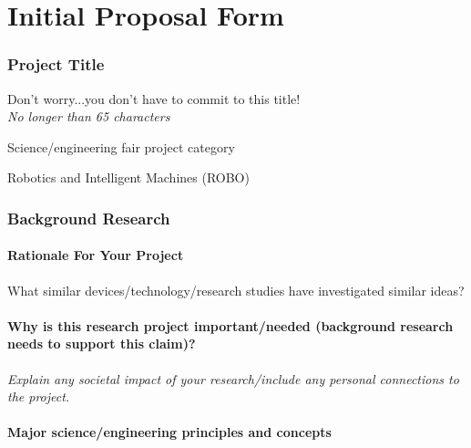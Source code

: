 \part{Initial Proposal Form}

\section{Project Title}

Don't worry...you don't have to commit to this title!\\
\emph{No longer than 65 characters}

\begin{field}
  \title
\end{field}

Science/engineering fair project category

\begin{field}
  Robotics and Intelligent Machines (ROBO)
\end{field}

\section{Background Research}

\subsection{Rationale For Your Project}

What similar devices/technology/research studies have investigated similar ideas?

\begin{field}

\end{field}

\subsection{Why is this research project important/needed (background research needs to support this claim)?}

\emph{Explain any societal impact of your research/include any personal
connections to the project.}

\begin{field}

\end{field}

\subsection{Major science/engineering principles and concepts}


